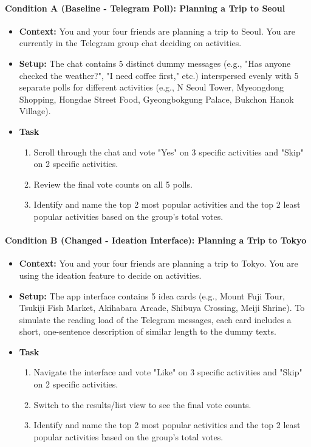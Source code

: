 \documentclass[12pt,a4paper]{article}
\begin{document}
\paragraph{Condition A (Baseline - Telegram Poll): Planning a Trip to Seoul}
\begin{itemize}
    \item \textbf{Context: }You and your four friends are planning a trip to Seoul. You are currently in the Telegram group chat deciding on activities.
    \item \textbf{Setup: }The chat contains 5 distinct dummy messages (e.g., "Has anyone checked the weather?", "I need coffee first," etc.) interspersed evenly with 5 separate polls for different activities (e.g., N Seoul Tower, Myeongdong Shopping, Hongdae Street Food, Gyeongbokgung Palace, Bukchon Hanok Village).
    \item {\textbf{Task}
    \begin{enumerate}
        \item Scroll through the chat and vote "Yes" on 3 specific activities and "Skip" on 2 specific activities.
        \item Review the final vote counts on all 5 polls.
        \item Identify and name the top 2 most popular activities and the top 2 least popular activities based on the group's total votes.
    \end{enumerate}
    }
\end{itemize}

\paragraph{Condition B (Changed - Ideation Interface): Planning a Trip to Tokyo}
\begin{itemize}
    \item \textbf{Context: }You and your four friends are planning a trip to Tokyo. You are using the ideation feature to decide on activities.
    \item \textbf{Setup: }The app interface contains 5 idea cards (e.g., Mount Fuji Tour, Tsukiji Fish Market, Akihabara Arcade, Shibuya Crossing, Meiji Shrine). To simulate the reading load of the Telegram messages, each card includes a short, one-sentence description of similar length to the dummy texts.
    \item {\textbf{Task}
    \begin{enumerate}
        \item Navigate the interface and vote "Like" on 3 specific activities and "Skip" on 2 specific activities. 
        \item Switch to the results/list view to see the final vote counts. 
        \item Identify and name the top 2 most popular activities and the top 2 least popular activities based on the group's total votes.
    \end{enumerate}
    }
\end{itemize}
\end{document}
